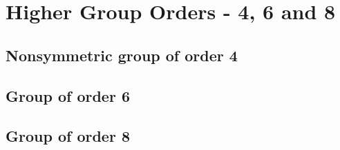 
\chapter{Higher Group Orders - 4, 6 and 8}

\section{Nonsymmetric group of order 4}
\section{Group of order 6}
\section{Group of order 8}

\endinput
